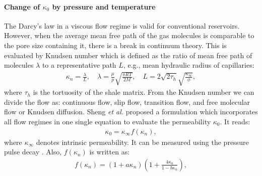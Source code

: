 \paragraph{Change of $\kappa_0$ by pressure and temperature} The Darcy's law in a viscous flow regime is valid for conventional reservoirs. However, when the average mean free path of the gas molecules is comparable to the pore size containing it, there is a break in continuum theory. This is evaluated by Knudsen number which is defined as the ratio of mean free path of molecules $\lambda$ to a representative path $L$, e.g., mean hydraulic radius of capillaries:
\begin{equation}
\begin{aligned}
\kappa_n=\frac{\lambda}{L}, \quad \lambda=\frac{\mu}{p}\sqrt{\frac{\pi R T}{2M}}, \quad L=2\sqrt{2\tau_h}\sqrt{\frac{\kappa_{\infty}}{\phi}},
\end{aligned}
\end{equation}
where $\tau_h$ is the tortuosity of the shale matrix.
From the Knudsen number we can divide the flow as: continuous flow, slip flow, transition flow, and free molecular flow or Knudsen diffusion.
Sheng \emph{et al.} \cite{Sheng2012} proposed a formulation which incorporates all flow regimes in one single equation to evaluate the permeability $\kappa_0$. It reads:
\begin{equation}
\begin{aligned}
\kappa_0=\kappa_{\infty}f(\kappa_n),
\end{aligned}
\end{equation}
where $\kappa_{\infty}$ denotes intrinsic permeability. It can be measured using the pressure pulse decay \cite{Sheng2012}. Also, $f(\kappa_n)$ is written as:
\begin{equation}
\begin{aligned}
f(\kappa_n)=\left(1+a\kappa_n\right)\left(1+\frac{4\kappa_n}{1-b\kappa_n}\right),
\end{aligned}
\end{equation}
